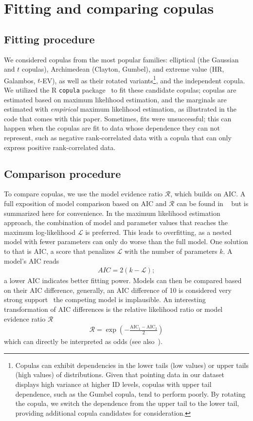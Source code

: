 \documentclass[acmlarge, manuscript,review]{acmart}
\begin{document}
\section{Fitting and comparing copulas\label{app:copula_method}}
\subsection{Fitting procedure\label{app:copula:fit}}
We considered copulas from the most popular families: elliptical (\eg the Gaussian and $t$ copulas), Archimedean (\eg Clayton, Gumbel), and extreme value (\eg HR, Galambos, $t$-EV), as well as their rotated variants\footnote{Copulas can exhibit dependencies in the lower tails (low values) or upper tails (high values) of distributions. Given that pointing data in our dataset displays high variance at higher ID levels, copulas with upper tail dependence, such as the Gumbel copula, tend to perform poorly. By rotating the copula, we switch the dependence from the upper tail to the lower tail, providing additional copula candidates for consideration.}, and the independent copula.
We utilized the R \texttt{copula} package~\cite{yan2007} to fit these candidate copulas; copulas are estimated based on maximum likelihood estimation, and the marginals are estimated with \textit{empirical} maximum likelihood estimation, as illustrated in the code that comes with this paper.
Sometimes, fits were unsuccessful; this can happen when the copulas are fit to data whose dependence they can not represent, such as negative rank-correlated data with a copula that can only express positive rank-correlated data.

\subsection{Comparison procedure\label{app:copula:compare}}
To compare copulas, we use the model evidence ratio $\mathcal{R}$, which builds on AIC. A full exposition of model comparison based on AIC and $\mathcal{R}$ can be found in ~\cite{anderson2004} but is summarized here for convenience. In the maximum likelihood estimation approach, the combination of model and parameter values that reaches the maximum log-likelihood $\mathcal{L}$ is preferred. This leads to overfitting, as a nested model with fewer parameters can only do worse than the full model. One solution to that is AIC, a score that penalizes $\mathcal{L}$ with the number of parameters $k$. A model's AIC reads
\begin{align}
  AIC = 2(k - \mathcal{L});
\end{align}
a lower AIC indicates better fitting power. Models can then be compared based on their AIC difference, generally, an AIC difference of 10 is considered very strong support~\cite{anderson2004} \ie the competing model is implausible. An interesting transformation of AIC differences is the relative likelihood ratio or model evidence ratio $\mathcal{R}$
\begin{align}
  \mathcal{R} = \exp \left(- \frac{\text{AIC}_1 - \text{AIC}_2}{2} \right)
\end{align}
which can directly be interpreted as odds (see also~\cite{wagenmakers2004}).
\end{document}

